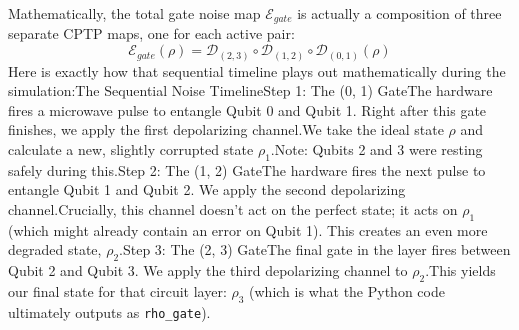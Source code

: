 \documentclass[11pt]{article}
\begin{document}
Mathematically, the total gate noise map $\mathcal{E}_{gate}$ is actually a composition of three separate CPTP maps, one for each active pair:$$\mathcal{E}_{gate}(\rho) = \mathcal{D}_{(2,3)} \circ \mathcal{D}_{(1,2)} \circ \mathcal{D}_{(0,1)}(\rho)$$Here is exactly how that sequential timeline plays out mathematically during the simulation:The Sequential Noise TimelineStep 1: The (0, 1) GateThe hardware fires a microwave pulse to entangle Qubit 0 and Qubit 1. Right after this gate finishes, we apply the first depolarizing channel.We take the ideal state $\rho$ and calculate a new, slightly corrupted state $\rho_1$.Note: Qubits 2 and 3 were resting safely during this.Step 2: The (1, 2) GateThe hardware fires the next pulse to entangle Qubit 1 and Qubit 2. We apply the second depolarizing channel.Crucially, this channel doesn't act on the perfect state; it acts on $\rho_1$ (which might already contain an error on Qubit 1). This creates an even more degraded state, $\rho_2$.Step 3: The (2, 3) GateThe final gate in the layer fires between Qubit 2 and Qubit 3. We apply the third depolarizing channel to $\rho_2$.This yields our final state for that circuit layer: $\rho_3$ (which is what the Python code ultimately outputs as \texttt{rho\_gate}).
\end{document}
